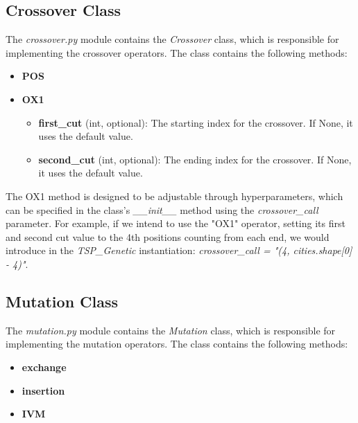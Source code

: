 \documentclass[11pt]{article}
\begin{document}
\subsection{Crossover Class}
The \textit{crossover.py} module contains the \textit{Crossover} class, which is responsible for implementing the crossover operators. The class contains the following methods:
\begin{itemize}
    \item \textbf{POS}
    \item \textbf{OX1}
        \begin{itemize}
            \item \textbf{first\_cut} (int, optional): The starting index for the crossover. If None, it uses the default value.
            \item \textbf{second\_cut} (int, optional): The ending index for the crossover. If None, it uses the default value.
        \end{itemize}
\end{itemize}
The OX1 method is designed to be adjustable through hyperparameters, which can be specified in the class's \textit{\_\_init\_\_} method using the \textit{crossover\_call} parameter. For example, if we intend to use the "OX1" operator, setting its first and second cut value to the 4th positions counting from each end, we would introduce in the \textit{TSP\_Genetic} instantiation: \textit{crossover\_call = "(4, cities.shape[0] - 4)"}.
    
\subsection{Mutation Class}
The \textit{mutation.py} module contains the \textit{Mutation} class, which is responsible for implementing the mutation operators. The class contains the following methods:
\begin{itemize}
    \item \textbf{exchange}
    \item \textbf{insertion}
    \item \textbf{IVM}
\end{itemize}
\end{document}
